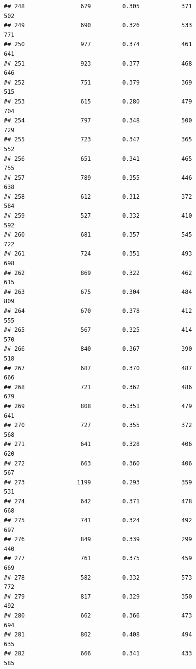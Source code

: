\documentclass[]{book}
\begin{document}
\begin{verbatim}
## 248                679         0.305            371                 502
## 249                690         0.326            533                 771
## 250                977         0.374            461                 641
## 251                923         0.377            468                 646
## 252                751         0.379            369                 515
## 253                615         0.280            479                 704
## 254                797         0.348            500                 729
## 255                723         0.347            365                 552
## 256                651         0.341            465                 755
## 257                789         0.355            446                 638
## 258                612         0.312            372                 584
## 259                527         0.332            410                 592
## 260                681         0.357            545                 722
## 261                724         0.351            493                 698
## 262                869         0.322            462                 615
## 263                675         0.304            484                 809
## 264                670         0.378            412                 555
## 265                567         0.325            414                 570
## 266                840         0.367            390                 518
## 267                687         0.370            487                 666
## 268                721         0.362            486                 679
## 269                808         0.351            479                 641
## 270                727         0.355            372                 568
## 271                641         0.328            406                 620
## 272                663         0.360            406                 567
## 273               1199         0.293            359                 531
## 274                642         0.371            478                 668
## 275                741         0.324            492                 697
## 276                849         0.339            299                 440
## 277                761         0.375            459                 669
## 278                582         0.332            573                 772
## 279                817         0.329            350                 492
## 280                662         0.366            473                 694
## 281                802         0.408            494                 635
## 282                666         0.341            433                 585

\end{verbatim}
\end{document}
